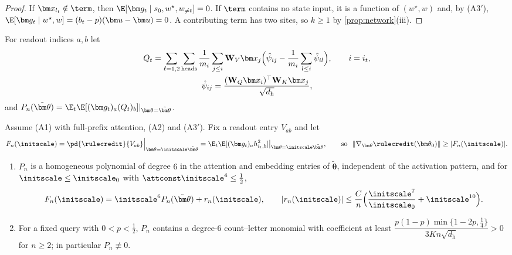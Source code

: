 \begin{proof}
If $\bm x_{l_t}\notin\term$, then $\E[\bm g_t\mid s_0,w^\star,w_{\ne t}]=0$. If $\term$ contains no state input, it is a function of $(w^\star,w)$ and, by (A3$'$),
$\E[\bm g_t\mid w^\star,w]=(b_t-p)(\bm u-\bm u)=0$. A contributing term has two sites, so $k\ge1$ by \cref{prop:network}(iii).
\end{proof}

For readout indices $a,b$ let
\begin{gather*}
 Q_t=\sum_{\ell=1,2}\sum_{\mathrm{heads}}\frac{1}{m_i}\sum_{j\le i}\mathbf W_V\bm x_j\Bigl(\hat\psi_{ij}-\frac{1}{m_i}\sum_{l\le i}\hat\psi_{il}\Bigr),\qquad i=i_t,\\
 \hat\psi_{ij}=\frac{(\mathbf W_Q\bm x_i)^\top\mathbf W_K\bm x_j}{\sqrt{d_{\mathrm h}}},
\end{gather*}
and $P_n(\tilde{\bm\theta})=\E_t\E[(\bm g_t)_a(Q_t)_b]|_{\bm\theta=\tilde{\bm\theta}}$.

\begin{lemma}
\label{lem:leading}
Assume (A1) with full-prefix attention, (A2) and (A3$'$). Fix a readout entry $V_{ab}$ and let
\[
 F_n(\initscale)=\pd{\rulecredit}{V_{ab}}\Big|_{\bm\theta=\initscale\tilde{\bm\theta}}=\E_t\E[(\bm g_t)_ah^2_{i_t,b}]\big|_{\bm\theta=\initscale\tilde{\bm\theta}},\qquad\text{so }\ \|\nabla_{\bm\theta}\rulecredit(\bm\theta_0)\|\ge|F_n(\initscale)|.
\]
\begin{enumerate}[label=(\roman*),leftmargin=*,itemsep=0pt,topsep=2pt]
\item $P_n$ is a homogeneous polynomial of degree $6$ in the attention and embedding entries of $\tilde{\bm\theta}$, independent of the activation
pattern, and for $\initscale\le\initscale_0$ with $\attconst\initscale^4\le\frac{1}{2}$,
\[
 F_n(\initscale)=\initscale^6P_n(\tilde{\bm\theta})+r_n(\initscale),\qquad |r_n(\initscale)|\le\frac{C}{n}\Bigl(\frac{\initscale^7}{\initscale_0}+\initscale^{10}\Bigr).
\]
\item For a fixed query with $0<p<\frac{1}{2}$, $P_n$ contains a degree-$6$ count--letter monomial with coefficient at least
$\dfrac{p(1-p)\min\{1-2p,\frac{1}{4}\}}{3Kn\sqrt{d_{\mathrm h}}}>0$ for $n\ge2$; in particular $P_n\not\equiv0$.
\end{enumerate}
\end{lemma}

